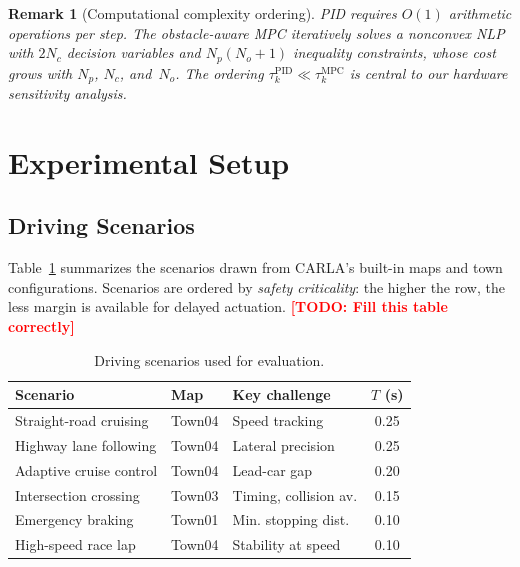 \documentclass[conference]{IEEEtran}
\newcommand{\TODO}[1]{\textcolor{red}{\textbf{[TODO: #1]}}}
\newtheorem{remark}{Remark}
\begin{document}
\begin{remark}[Computational complexity ordering]
  PID requires $O(1)$ arithmetic operations per step.
  The obstacle-aware MPC iteratively solves a nonconvex NLP
  with $2N_c$ decision variables and $N_p(N_o+1)$ inequality
  constraints, whose cost grows with $N_p$, $N_c$, and~$N_o$.
  The ordering
  $\tau_k^{\mathrm{PID}} \ll \tau_k^{\mathrm{MPC}}$
  is central to our hardware sensitivity analysis.
\end{remark}

\section{Experimental Setup}\label{sec:experiments}

\subsection{Driving Scenarios}

Table~\ref{tab:scenarios} summarizes the scenarios drawn from
CARLA's built-in maps and town configurations.  Scenarios are ordered
by \emph{safety criticality}: the higher the row, the less margin is
available for delayed actuation. \TODO{Fill this table correctly}

\begin{table}[h]
  \centering
  \caption{Driving scenarios used for evaluation.}
  \label{tab:scenarios}
  \renewcommand{\arraystretch}{1.2}
  \footnotesize
  \begin{tabular}{llp{2.6cm}c}
    \toprule
    \textbf{Scenario} & \textbf{Map} & \textbf{Key challenge}
      & \textbf{$T$ (s)}\\
    \midrule
    Straight-road cruising     & Town04 & Speed tracking        & 0.25 \\
    Highway lane following     & Town04 & Lateral precision     & 0.25 \\
    Adaptive cruise control    & Town04 & Lead-car gap          & 0.20 \\
    Intersection crossing      & Town03 & Timing, collision av. & 0.15 \\
    Emergency braking          & Town01 & Min. stopping dist.   & 0.10 \\
    High-speed race lap        & Town04 & Stability at speed    & 0.10 \\
    \bottomrule
  \end{tabular}
\end{table}
\end{document}
